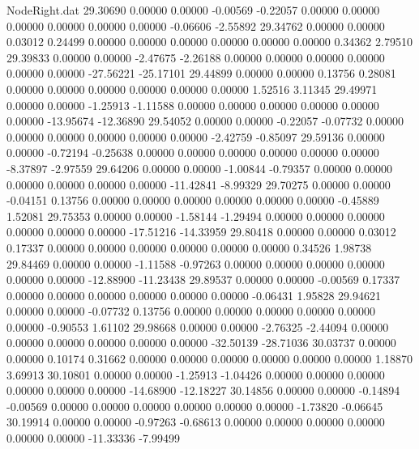 \begin{filecontents}{NodeRight.dat}
  29.30690    0.00000    0.00000    -0.00569   -0.22057    0.00000    0.00000    0.00000    0.00000    0.00000    0.00000   -0.06606   -2.55892
  29.34762    0.00000    0.00000     0.03012    0.24499    0.00000    0.00000    0.00000    0.00000    0.00000    0.00000    0.34362    2.79510
  29.39833    0.00000    0.00000    -2.47675   -2.26188    0.00000    0.00000    0.00000    0.00000    0.00000    0.00000  -27.56221  -25.17101
  29.44899    0.00000    0.00000     0.13756    0.28081    0.00000    0.00000    0.00000    0.00000    0.00000    0.00000    1.52516    3.11345
  29.49971    0.00000    0.00000    -1.25913   -1.11588    0.00000    0.00000    0.00000    0.00000    0.00000    0.00000  -13.95674  -12.36890
  29.54052    0.00000    0.00000    -0.22057   -0.07732    0.00000    0.00000    0.00000    0.00000    0.00000    0.00000   -2.42759   -0.85097
  29.59136    0.00000    0.00000    -0.72194   -0.25638    0.00000    0.00000    0.00000    0.00000    0.00000    0.00000   -8.37897   -2.97559
  29.64206    0.00000    0.00000    -1.00844   -0.79357    0.00000    0.00000    0.00000    0.00000    0.00000    0.00000  -11.42841   -8.99329
  29.70275    0.00000    0.00000    -0.04151    0.13756    0.00000    0.00000    0.00000    0.00000    0.00000    0.00000   -0.45889    1.52081
  29.75353    0.00000    0.00000    -1.58144   -1.29494    0.00000    0.00000    0.00000    0.00000    0.00000    0.00000  -17.51216  -14.33959
  29.80418    0.00000    0.00000     0.03012    0.17337    0.00000    0.00000    0.00000    0.00000    0.00000    0.00000    0.34526    1.98738
  29.84469    0.00000    0.00000    -1.11588   -0.97263    0.00000    0.00000    0.00000    0.00000    0.00000    0.00000  -12.88900  -11.23438
  29.89537    0.00000    0.00000    -0.00569    0.17337    0.00000    0.00000    0.00000    0.00000    0.00000    0.00000   -0.06431    1.95828
  29.94621    0.00000    0.00000    -0.07732    0.13756    0.00000    0.00000    0.00000    0.00000    0.00000    0.00000   -0.90553    1.61102
  29.98668    0.00000    0.00000    -2.76325   -2.44094    0.00000    0.00000    0.00000    0.00000    0.00000    0.00000  -32.50139  -28.71036
  30.03737    0.00000    0.00000     0.10174    0.31662    0.00000    0.00000    0.00000    0.00000    0.00000    0.00000    1.18870    3.69913
  30.10801    0.00000    0.00000    -1.25913   -1.04426    0.00000    0.00000    0.00000    0.00000    0.00000    0.00000  -14.68900  -12.18227
  30.14856    0.00000    0.00000    -0.14894   -0.00569    0.00000    0.00000    0.00000    0.00000    0.00000    0.00000   -1.73820   -0.06645
  30.19914    0.00000    0.00000    -0.97263   -0.68613    0.00000    0.00000    0.00000    0.00000    0.00000    0.00000  -11.33336   -7.99499

\end{filecontents}
